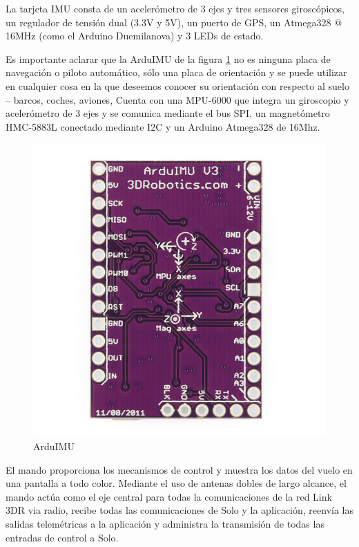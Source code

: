 La tarjeta IMU consta de un acelerómetro de 3 ejes y tres sensores giroscópicos, un regulador de tensión dual (3.3V y 5V), un puerto de GPS, un Atmega328 @ 16MHz (como el Arduino Duemilanova) y 3 LEDs de estado.

Es importante aclarar que la ArduIMU de la figura \ref{fig:arduimu} no es ninguna placa de navegación o piloto automático, sólo una placa de orientación y se puede utilizar en cualquier cosa en la que deseemos conocer su orientación con respecto al suelo – barcos, coches, aviones,
Cuenta con una MPU-6000 que integra un giroscopio y acelerómetro de 3 ejes y se comunica mediante el bus SPI, un magnetómetro HMC-5883L conectado mediante I2C y un Arduino Atmega328 de 16Mhz.

\begin{figure}[H]
  \centering
  \includegraphics[scale=1]{imagenes/arduimutrasera.jpg}
  \caption{ArduIMU}
  \label{fig:arduimu}
\end{figure}

El mando proporciona los mecanismos de control y muestra los datos del vuelo en una pantalla a todo
color. Mediante el uso de antenas dobles de largo alcance, el mando actúa como el eje central para todas la
comunicaciones de la red Link 3DR via radio, recibe todas las comunicaciones de Solo y la aplicación, reenvía las salidas telemétricas a la aplicación y administra la transmisión de todas las entradas de control a Solo.

